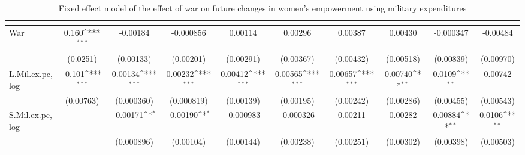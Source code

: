 \begin{table}[htbp]\centering
\def\sym#1{\ifmmode^{#1}\else\(^{#1}\)\fi}
\caption{Fixed effect model of the effect of war on future changes in women's empowerment using military expenditures \label{fepolemmilex}}
\begin{tabular}{l*{9}{c}}
\hline\hline
                    &&&&&&&&&\\
\hline
War                 &       0.160\sym{***}&    -0.00184         &   -0.000856         &     0.00114         &     0.00296         &     0.00387         &     0.00430         &   -0.000347         &    -0.00484         \\
                    &    (0.0251)         &   (0.00133)         &   (0.00201)         &   (0.00291)         &   (0.00367)         &   (0.00432)         &   (0.00518)         &   (0.00839)         &   (0.00970)         \\
[1em]
L.Mil.ex.pc,log     &      -0.101\sym{***}&     0.00134\sym{***}&     0.00232\sym{***}&     0.00412\sym{***}&     0.00565\sym{***}&     0.00657\sym{***}&     0.00740\sym{**} &      0.0109\sym{**} &     0.00742         \\
                    &   (0.00763)         &  (0.000360)         &  (0.000819)         &   (0.00139)         &   (0.00195)         &   (0.00242)         &   (0.00286)         &   (0.00455)         &   (0.00543)         \\
[1em]
S.Mil.ex.pc,log     &                     &    -0.00171\sym{*}  &    -0.00190\sym{*}  &   -0.000983         &   -0.000326         &     0.00211         &     0.00282         &     0.00884\sym{**} &      0.0106\sym{**} \\
                    &                     &  (0.000896)         &   (0.00104)         &   (0.00144)         &   (0.00238)         &   (0.00251)         &   (0.00302)         &   (0.00398)         &   (0.00503)         \\

\end{tabular}
\end{table}
